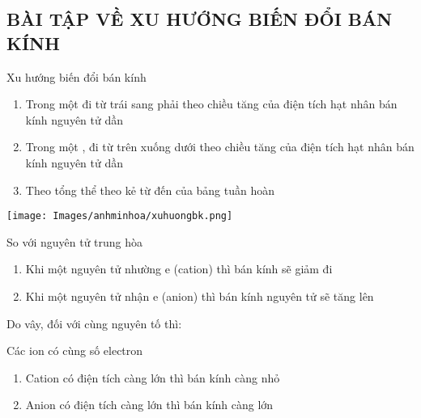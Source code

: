 \subsection{BÀI TẬP VỀ XU HƯỚNG BIẾN ĐỔI BÁN KÍNH}
\begin{dangntd}{Xu hướng biến đổi bán kính}
	\begin{enumerate}
		\item Trong một  đi từ trái sang phải theo chiều tăng của điện tích hạt nhân bán kính nguyên tử  dần
		\item Trong một , đi từ trên xuống dưới theo chiều tăng của điện tích hạt nhân bán kính nguyên tử  dần
		\item Theo tổng thể   theo  kẻ từ  đến  của bảng tuần hoàn
	\end{enumerate}
	\begin{center}
		\texttt{[image: Images/anhminhoa/xuhuongbk.png]}
	\end{center}
	So với nguyên tử trung hòa
	\begin{enumerate}
		\item Khi một nguyên tử nhường e (cation) thì bán kính sẽ giảm đi
		\item Khi một nguyên tử nhận e (anion) thì bán kính nguyên tử sẽ tăng lên
	\end{enumerate}
	Do vây, đối với cùng nguyên tố thì:
	\begin{center}
	\end{center}
	Các ion có cùng số electron
	\begin{enumerate}
		\item Cation có điện tích càng lớn thì bán kính càng nhỏ
		\item Anion có điện tích càng lớn thì bán kính càng lớn
	\end{enumerate}
\end{dangntd}
\newpage
{}
